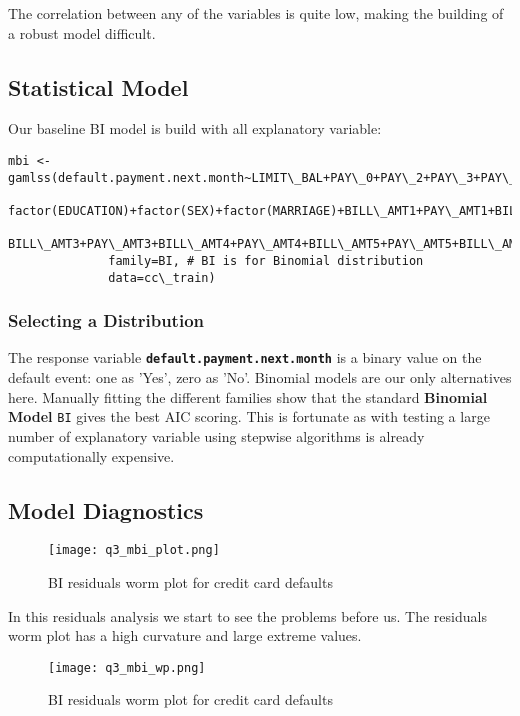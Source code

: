 The correlation between any of the variables is quite low, making the building of a robust model difficult.

\subsection{Statistical Model}

Our baseline BI model is build with all explanatory variable:
\begin{verbatim}
mbi <- gamlss(default.payment.next.month~LIMIT\_BAL+PAY\_0+PAY\_2+PAY\_3+PAY\_4+PAY\_5+PAY\_6+AGE+
                factor(EDUCATION)+factor(SEX)+factor(MARRIAGE)+BILL\_AMT1+PAY\_AMT1+BILL\_AMT2+PAY\_AMT2+
                BILL\_AMT3+PAY\_AMT3+BILL\_AMT4+PAY\_AMT4+BILL\_AMT5+PAY\_AMT5+BILL\_AMT6+PAY\_AMT6, 
              family=BI, # BI is for Binomial distribution
              data=cc\_train)
\end{verbatim}


\subsubsection{Selecting a Distribution}

The response variable \textbf{\texttt{default.payment.next.month}} is a binary value on the default event: one as 'Yes', zero as 'No'.
Binomial models are our only alternatives here. Manually fitting the different families show that the standard \textbf{Binomial Model}
\verb|BI| gives the best AIC scoring.  This is fortunate as with testing a large number of explanatory variable using stepwise
algorithms is already computationally expensive.


\subsection{Model Diagnostics}

\begin{figure}[H]
  \texttt{[image: q3\_mbi\_plot.png]}
  \caption{BI residuals worm plot for credit card defaults}
\end{figure}

In this residuals analysis we start to see the problems before us.  The residuals worm plot has a high curvature and large extreme
values.

\begin{figure}[H]
  \texttt{[image: q3\_mbi\_wp.png]}
  \caption{BI residuals worm plot for credit card defaults}
\end{figure}

